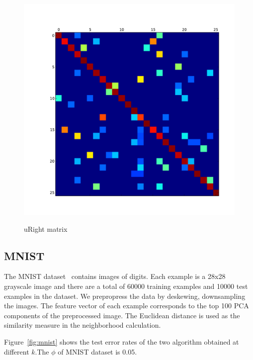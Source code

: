 \documentclass{article}
\begin{document}
\begin{figure}[ht]
\vskip 0.2in
\begin{center}
\centering
  \includegraphics[width=.95\linewidth]{figures/icml-uright-matrix-82.pdf}\\
  \caption{uRight matrix}
  \label{fig:uright-matrix}
\end{center}
\vskip -0.2in
\end{figure}


\subsection{MNIST}
The MNIST dataset~\cite{Lecun1998} contains images of digits. Each
example is a 28x28 grayscale image and there are a total of 60000
training examples and 10000 test examples in the dataset. We
prepropress the data by deskewing, downsampling the images. The
feature vector of each example corresponds to the top 100 PCA
components of the preprocessed image. The Euclidean distance is used
as the similarity measure in the neighborhood calculation.

Figure~\ref{fig:mnist} shows the test error rates
of the two algorithm obtained at different $k$.The $\phi$ of MNIST
dataset is 0.05.
\end{document}
